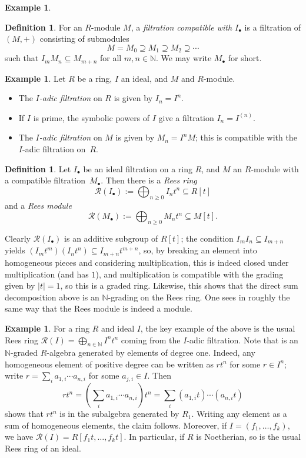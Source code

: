 \documentclass{amsart}[12pt]
\newcommand{\N}{\mathbb{N}}
\newcommand{\NN}{\mathbb{N}}
\newcommand{\DEF}[1]{\emph{#1}\index{#1}}
\numberwithin{equation}{section}
\theoremstyle{plain} %
\theoremstyle{definition}
\newtheorem{definition}[equation]{Definition}
\newtheorem{ex}[equation]{Example}
\newtheorem{example}[equation]{Example}
\theoremstyle{remark}
\begin{document}
\begin{ex}
\begin{definition}
	For an $R$-module $M$, a \emph{filtration compatible with $I_{\bullet}$} is a filtration of $(M,+)$ consisting of submodules
	\[ M =M_0 \supseteq M_1 \supseteq M_2 \supseteq \cdots \]
	such that $I_m M_n \subseteq M_{m+n}$ for all $m,n\in \NN$. 
We may write $M_\bullet$ for short.
\end{definition}

\begin{ex} Let $R$ be a ring, $I$ an ideal, and $M$ and $R$-module.
\begin{itemize} \item The \DEF{$I$-adic filtration} on $R$ is given by $I_n = I^n$.
\item If $I$ is prime, the symbolic powers of $I$ give a filtration $I_n = I^{(n)}$.
\item The \emph{$I$-adic filtration} on $M$ is given by $M_n = I^n M$; this is compatible with the $I$-adic filtration on~$R$.
\end{itemize}
\end{ex}


\begin{definition}
	Let $I_{\bullet}$ be an ideal filtration on a ring $R$, and $M$ an $R$-module with a compatible filtration~$M_{\bullet}$. Then there is a \emph{Rees ring}
	\[ \mathcal{R}(I_{\bullet}) := \bigoplus_{n \geq 0} I_n t^n \subseteq R[t]\]
		and a \emph{Rees module}
	 	\[ \mathcal{R}(M_{\bullet}) := \bigoplus_{n\geq 0} M_n t^n \subseteq M[t].\]
\end{definition}

Clearly $\mathcal{R}(I_{\bullet})$ is an additive subgroup of $R[t]$; the condition $I_m I_n\subseteq I_{m+n}$ yields $(I_m t^m) (I_n t^n) \subseteq I_{m+n} t^{m+n}$, so, by breaking an element into homogeneous pieces and considering multiplication, this is indeed closed under multiplication (and has $1$), and multiplication is compatible with the grading given by $|t|=1$, so this is a graded ring. Likewise, this shows that the direct sum decomposition above is an $\NN$-grading on the Rees ring. One sees in roughly the same way that the Rees module is indeed a module.

\begin{example} For a ring $R$ and ideal $I$, the key example of the above is the usual Rees ring $\mathcal{R}(I)= \bigoplus_{n\in \N} I^n t^n$ coming from the $I$-adic filtration. Note that is an $\NN$-graded $R$-algebra generated by elements of degree one. Indeed, any homogeneous element of positive degree can be written as $r t^n$ for some $r\in I^n$; write $r=\sum_i a_{1,i} \cdots a_{n,i}$ for some $a_{j,i}\in I$. Then 
\[ r t^n = \left( \sum_i a_{1,i} \cdots a_{n,i} \right) t^n = \sum_i (a_{1,i} t) \cdots (a_{n,i} t) \]
shows that $r t^n$ is in the subalgebra generated by $R_1$. Writing any element as a sum of homogeneous elements, the claim follows. Moreover, if $I=(f_1,\dots,f_k)$, we have $\mathcal{R}(I) = R[f_1 t,\dots,f_k t]$. In particular, if $R$ is Noetherian, so is the usual Rees ring of an ideal.
 \end{example}



\end{ex}
\end{document}

